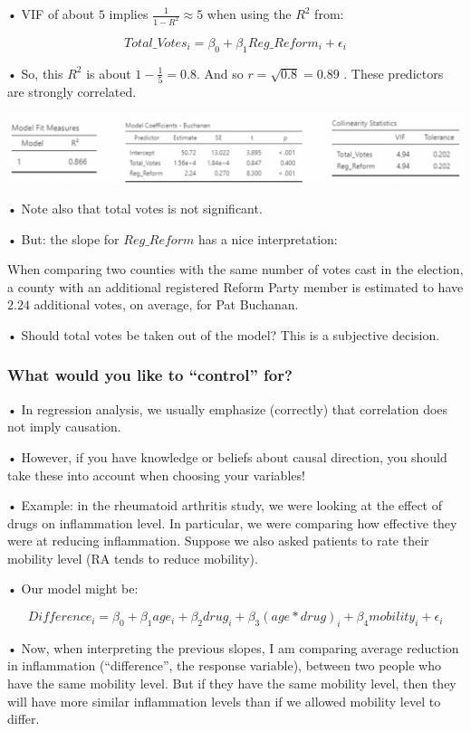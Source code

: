 \documentclass[
  letterpaper,
  DIV=11,
  numbers=noendperiod]{scrreprt}
\begin{document}
• VIF of about \(5\) implies \(\frac{1}{1-R^2}\approx 5\) when using the
\(R^2\) from:

\[
Total\_Votes_i = \beta_0 + \beta_1Reg\_Reform_i + \epsilon_i
\]

• So, this \(R^2\) is about \(1 − \frac{1}{5} = 0.8\). And so
\(r = \sqrt{0.8} =0.89\) . These predictors are strongly correlated.

\includegraphics{images/mod4_pt2_21.png}

• Note also that total votes is not significant.

• But: the slope for \(Reg\_Reform\) has a nice interpretation:

When comparing two counties with the same number of votes cast in the
election, a county with an additional registered Reform Party member is
estimated to have \(2.24\) additional votes, on average, for Pat
Buchanan.

• Should total votes be taken out of the model? This is a subjective
decision.

\hypertarget{what-would-you-like-to-control-for}{%
\subsubsection{What would you like to ``control''
for?}\label{what-would-you-like-to-control-for}}

• In regression analysis, we usually emphasize (correctly) that
correlation does not imply causation.

• However, if you have knowledge or beliefs about causal direction, you
should take these into account when choosing your variables!

• Example: in the rheumatoid arthritis study, we were looking at the
effect of drugs on inflammation level. In particular, we were comparing
how effective they were at reducing inflammation. Suppose we also asked
patients to rate their mobility level (RA tends to reduce mobility).

• Our model might be:

\[
Difference_i = \beta_0 + \beta_1age_i + \beta_2drug_i + \beta_3(age*drug)_i + \beta_4mobility_i + \epsilon_i
\]

• Now, when interpreting the previous slopes, I am comparing average
reduction in inflammation (``difference'', the response variable),
between two people who have the same mobility level. But if they have
the same mobility level, then they will have more similar inflammation
levels than if we allowed mobility level to differ.
\end{document}
